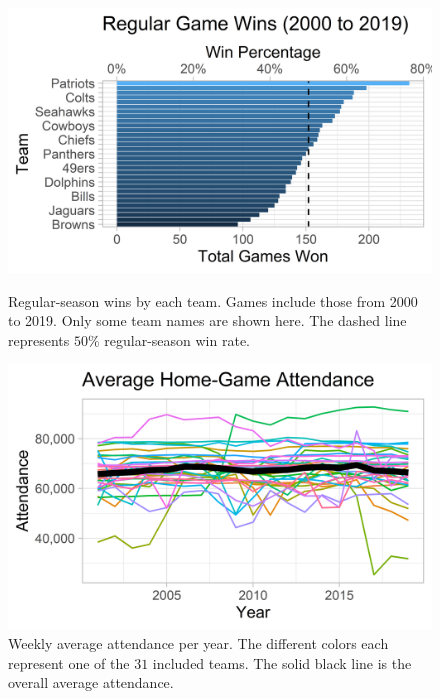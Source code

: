 \documentclass[11pt]{article}
\begin{document}
\begin{figure}
    \centering
    \begin{minipage}{.475\textwidth}
        \includegraphics[width=\linewidth]{Games_Won.png}
        \caption{\footnotesize Regular-season wins by each team. Games include those from 2000 to 2019. Only some team names are shown here. The dashed line represents $50\%$ regular-season win rate. \vspace*{-.5\baselineskip}}
        \label{fig:games_won}
    \end{minipage}\hfill
    \begin{minipage}{.475\textwidth}
        \includegraphics[width=\linewidth]{Yearly_Attendance.png}
        \caption{\footnotesize Weekly average attendance per year. The different colors each represent one of the $31$ included teams. The solid black line is the overall average attendance. \vspace*{-.5\baselineskip}}
        \label{fig:year_att}
    \end{minipage}
\end{figure}
\end{document}

